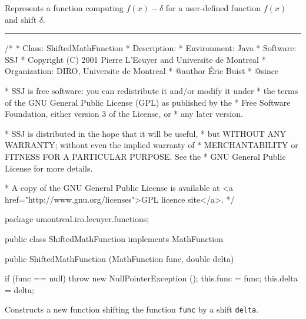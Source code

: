 
Represents a function computing $f(x) - \delta$ for a user-defined function
$f(x)$ and shift $\delta$.

\bigskip\hrule

\begin{code}
\begin{hide}
/*
 * Class:        ShiftedMathFunction
 * Description:  
 * Environment:  Java
 * Software:     SSJ 
 * Copyright (C) 2001  Pierre L'Ecuyer and Universite de Montreal
 * Organization: DIRO, Universite de Montreal
 * @author       Éric Buist
 * @since

 * SSJ is free software: you can redistribute it and/or modify it under
 * the terms of the GNU General Public License (GPL) as published by the
 * Free Software Foundation, either version 3 of the License, or
 * any later version.

 * SSJ is distributed in the hope that it will be useful,
 * but WITHOUT ANY WARRANTY; without even the implied warranty of
 * MERCHANTABILITY or FITNESS FOR A PARTICULAR PURPOSE.  See the
 * GNU General Public License for more details.

 * A copy of the GNU General Public License is available at
   <a href="http://www.gnu.org/licenses">GPL licence site</a>.
 */
\end{hide}
package umontreal.iro.lecuyer.functions;\begin{hide}

\end{hide}

public class ShiftedMathFunction implements MathFunction\begin{hide}

,
      MathFunctionWithFirstDerivative, MathFunctionWithDerivative,
      MathFunctionWithIntegral {
   MathFunction func;
   double delta;
\end{hide}

   public ShiftedMathFunction (MathFunction func, double delta)\begin{hide} {
      if (func == null)
         throw new NullPointerException ();
      this.func = func;
      this.delta = delta;
   }\end{hide}
\end{code}
\begin{tabb}   Constructs a new function shifting the function \texttt{func} by
 a shift \texttt{delta}.
\end{tabb}
\begin{htmlonly}
\end{htmlonly}
